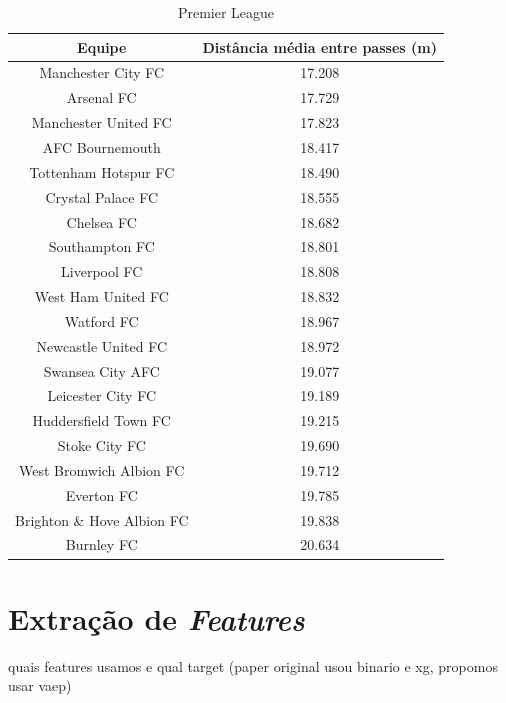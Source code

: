 \documentclass{article}
\begin{document}
\begin{table}[H]
	\centering
	\begin{tabular}{|c|c|}
		\hline
		\textbf{Equipe}            & \textbf{Distância média entre
			passes (m)}
		\\ \hline
		Manchester City FC         & 17.208
		\\ \hline
		Arsenal FC                 & 17.729
		\\ \hline
		Manchester United FC       & 17.823
		\\ \hline
		AFC Bournemouth            & 18.417
		\\ \hline
		Tottenham Hotspur FC       & 18.490
		\\ \hline
		Crystal Palace FC          & 18.555
		\\ \hline
		Chelsea FC                 & 18.682
		\\ \hline
		Southampton FC             & 18.801
		\\ \hline
		Liverpool FC               & 18.808
		\\ \hline
		West Ham United FC         & 18.832
		\\ \hline
		Watford FC                 & 18.967
		\\ \hline
		Newcastle United FC        & 18.972
		\\ \hline
		Swansea City AFC           & 19.077
		\\ \hline
		Leicester City FC          & 19.189
		\\ \hline
		Huddersfield Town FC       & 19.215
		\\ \hline
		Stoke City FC              & 19.690
		\\ \hline
		West Bromwich Albion FC    & 19.712
		\\ \hline
		Everton FC                 & 19.785
		\\ \hline
		Brighton \& Hove Albion FC & 19.838
		\\ \hline
		Burnley FC                 & 20.634
		\\ \hline
	\end{tabular}
	\caption{Premier League}
	\label{tab:average_distance_england}
\end{table}

\section{Extração de \textit{Features}}

quais features usamos e qual target (paper original usou binario e xg, propomos
usar vaep)
\end{document}
